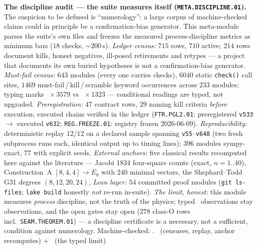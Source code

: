 \documentclass[11pt,a4paper]{article}
\theoremstyle{definition}
\begin{document}
\par\smallskip\noindent\textbf{The discipline audit --- the suite measures
itself (\texttt{META.DISCIPLINE.01}).}
The suspicion to be defused is ``numerology'': a large corpus of
machine-checked claims could in principle be a confirmation-bias
generator.  This meta-module parses the suite's own files and freezes
the measured process-discipline metrics as minimum bars ($18$ checks,
${\sim}200$\,s).  \emph{Ledger census:} $715$ rows, $710$ active;
$214$ rows document kills, honest negatives, ill-posed retirements and
retypes --- a project that documents its own buried hypotheses is not a
confirmation-bias generator.  \emph{Must-fail census:} $643$ modules
(every one carries checks), $6040$ static \texttt{check()} call sites,
$1469$ must-fail\,/\,kill\,/\,scramble keyword occurrences across
$233$ modules; typing marks \mE~$\times\,3579$ vs \mC~$\times\,1323$
--- conditional readings are typed, not upgraded.
\emph{Preregistration:} $47$ contract rows, $29$ naming kill criteria
\emph{before} execution; executed chains verified in the ledger
(\texttt{FTR.PGL2.01}: preregistered \texttt{v533} $\to$ executed
\texttt{v632}; \texttt{REG.FREEZE.01}: registry
frozen 2026-06-09).  \emph{Reproducibility:} deterministic replay
$12/12$ on a declared sample spanning \texttt{v55}--\texttt{v648}
(two fresh subprocess runs each, identical output up to timing lines);
$396$ modules sympy-exact, $77$ with explicit seeds.  \emph{External
anchors:} five classical results recomputed here against the
literature --- Jacobi 1834 four-square counts (exact, $n=1..40$),
Construction~A $[8,4,4]\to E_8$ with $240$ minimal vectors, the
Shephard--Todd G31 degrees $(8,12,20,24)$,   \emph{Lean layer:} $54$ committed proof modules
(\texttt{git ls-files}; \texttt{lake build} honestly \emph{not} re-run
in-suite).  \emph{The limit, honest:} this module measures
\emph{process} discipline, not the truth of the physics; typed \mC\
observations stay observations, and the open gates stay open ($278$
class-O rows incl.\ \texttt{SEAM.THEOREM.01}) --- a discipline certificate is
a necessary, not a sufficient, condition against numerology.
Machine-checked: .
\mE\ (censuses, replay, anchor recomputes) $+$ \mC\ (the typed limit)
\par\smallskip
\end{document}

